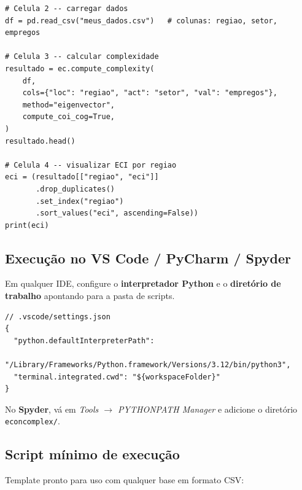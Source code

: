 \documentclass[12pt, a4paper]{article}
\begin{document}
\begin{lstlisting}[caption={C\'{e}lulas subsequentes --- uso normal}]
# Celula 2 -- carregar dados
df = pd.read_csv("meus_dados.csv")   # colunas: regiao, setor, empregos

# Celula 3 -- calcular complexidade
resultado = ec.compute_complexity(
    df,
    cols={"loc": "regiao", "act": "setor", "val": "empregos"},
    method="eigenvector",
    compute_coi_cog=True,
)
resultado.head()

# Celula 4 -- visualizar ECI por regiao
eci = (resultado[["regiao", "eci"]]
       .drop_duplicates()
       .set_index("regiao")
       .sort_values("eci", ascending=False))
print(eci)
\end{lstlisting}

\subsection{Execu\c{c}\~{a}o no VS Code / PyCharm / Spyder}

Em qualquer IDE, configure o \textbf{interpretador Python} e o
\textbf{diret\'{o}rio de trabalho} apontando para a pasta de scripts.

\begin{lstlisting}[style=bashstyle,
  caption={Configurar caminho no VS Code (settings.json)}]
// .vscode/settings.json
{
  "python.defaultInterpreterPath":
      "/Library/Frameworks/Python.framework/Versions/3.12/bin/python3",
  "terminal.integrated.cwd": "${workspaceFolder}"
}
\end{lstlisting}

No \textbf{Spyder}, v\'{a} em \textit{Tools $\to$ PYTHONPATH Manager}
e adicione o diret\'{o}rio \texttt{econcomplex/}.

\subsection{Script m\'{i}nimo de execu\c{c}\~{a}o}

Template pronto para uso com qualquer base em formato CSV:
\end{document}
